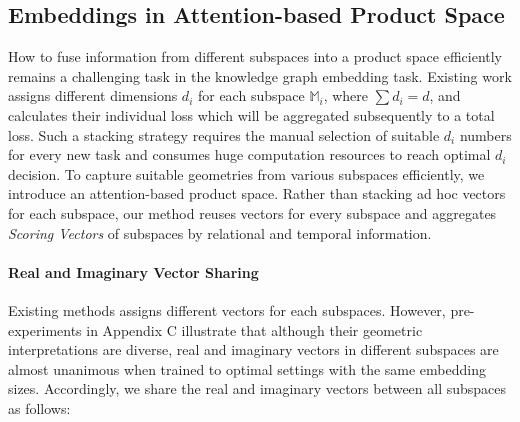 \documentclass[letterpaper]{article} %
\begin{document}

\subsection{\textbf{Embeddings in Attention-based Product Space}}
How to fuse information from different subspaces into a product space  efficiently remains a challenging task in the knowledge graph embedding task. Existing work \cite{han2020dyernie} assigns different dimensions $d_{i}$ for each subspace $\mathbb{M}_i$, where $\sum{d_{i}} = d $, and calculates their individual loss which will be aggregated subsequently to a total loss. Such a stacking strategy requires the manual selection of suitable $d_{i}$ numbers for every new task and consumes huge computation resources to reach optimal $d_{i}$ decision.
To capture suitable geometries from various subspaces efficiently, we introduce an attention-based product space. Rather than stacking ad hoc vectors for each subspace, our method reuses vectors for every subspace and aggregates \textit{Scoring Vectors} of subspaces by relational and temporal information.

\paragraph{\textbf{Real and Imaginary Vector Sharing}} Existing methods \cite{han2020dyernie} assigns different vectors for each subspaces. However, pre-experiments in Appendix C illustrate that although their geometric interpretations are diverse, real and imaginary vectors in different subspaces are almost unanimous when trained to optimal settings with the same embedding sizes. Accordingly, we share the real and imaginary vectors between all subspaces as follows:
\end{document}
